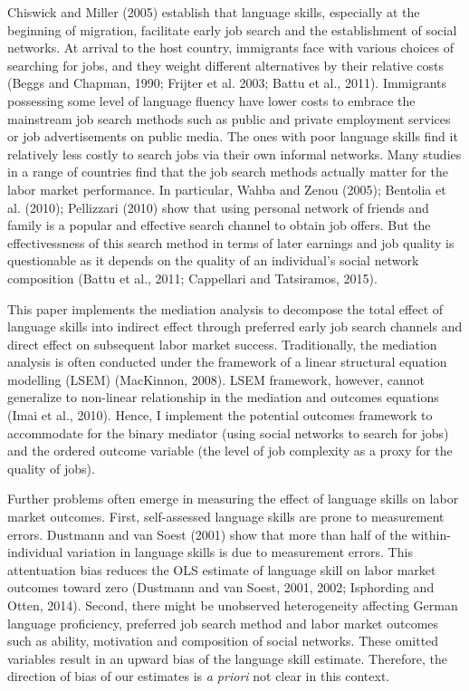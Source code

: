 \documentclass[12pt,a4paper]{article}
\begin{document}
Chiswick and Miller (2005) establish that language skills, especially at the beginning of migration, facilitate early job search and the establishment of social networks. At arrival to the host country, immigrants face with various choices of searching for jobs, and they weight different alternatives by their relative costs (Beggs and Chapman, 1990; Frijter et al. 2003; Battu et al., 2011). Immigrants possessing some level of language fluency have lower costs to embrace the mainstream job search methods such as public and private employment services or job advertisements on public media. The ones with poor language skills find it relatively less costly to search jobs via their own informal networks. Many studies in a range of countries find that the job search methods actually matter for the labor market performance. In particular, Wahba and Zenou (2005); Bentolia et al. (2010); Pellizzari (2010) show that using personal network of friends and family is a popular and effective search channel to obtain job offers. But the effectivessness of this search method in terms of later earnings and job quality is questionable as it depends on the quality of an individual's social network composition (Battu et al., 2011; Cappellari and Tatsiramos, 2015). 

This paper implements the mediation analysis to decompose the total effect of language skills into indirect effect through preferred early job search channels and direct effect on subsequent labor market success. Traditionally, the mediation analysis is often conducted under the framework of a linear structural equation modelling (LSEM) (MacKinnon, 2008). LSEM framework, however, cannot generalize to non-linear relationship in the mediation and outcomes equations (Imai et al., 2010). Hence, I implement the potential outcomes framework to accommodate for the binary mediator (using social networks to search for jobs) and the ordered outcome variable (the level of job complexity as a proxy for the quality of jobs).

Further problems often emerge in measuring the effect of language skills on labor market outcomes. First, self-assessed language skills are prone to measurement errors. Dustmann and van Soest (2001) show that more than half of the within-individual variation in language skills is due to measurement errors. This attentuation bias reduces the OLS estimate of language skill on labor market outcomes toward zero (Dustmann and van Soest, 2001, 2002; Isphording and Otten, 2014). Second, there might be unobserved heterogeneity affecting German language proficiency, preferred job search method and labor market outcomes such as ability, motivation and composition of social networks. These omitted variables result in an upward bias of the language skill estimate. Therefore, the direction of bias of our estimates is \textit{a priori} not clear in this context.
\end{document}
